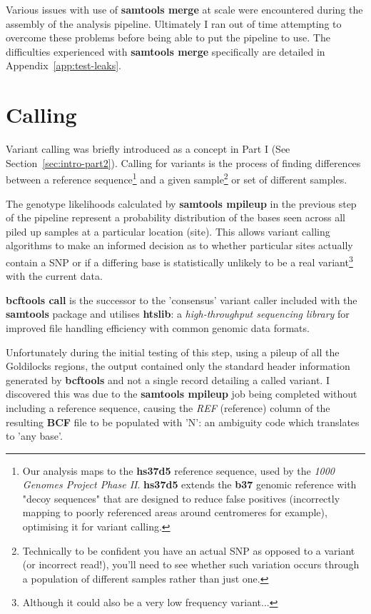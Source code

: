 Various issues with use of \textbf{samtools merge} at scale were encountered
during the assembly of the analysis pipeline. Ultimately I ran out of time
attempting to overcome these problems before being able to put the pipeline to
use. The difficulties experienced with \textbf{samtools merge} specifically are
detailed in Appendix~\ref{app:test-leaks}.



\section{Calling}

Variant calling was briefly introduced as a concept in Part I
(See Section~\ref{sec:intro-part2}). Calling for variants is the process
of finding differences between a reference sequence\footnote{Our analysis maps
    to the \textbf{hs37d5} reference sequence, used by the \textit{1000 Genomes
    Project Phase II}\citep{1k-refs}. \textbf{hs37d5} extends the \textbf{b37} genomic
    reference with "decoy sequences" that are designed to reduce false
    positives (incorrectly mapping to poorly referenced areas around centromeres for
    example\citep{biostar:decoy}), optimising it for variant
calling\citep{1k-slides}.} and a given sample\footnote{Technically to be confident
    you have an actual SNP as opposed to a variant (or incorrect read!), you'll
    need to see whether such variation occurs through a population of different
samples rather than just one.} or set of different samples.

The genotype likelihoods calculated by \textbf{samtools mpileup} in the previous
step of the pipeline represent a probability distribution of the bases seen
across all piled up samples at a particular location (site). This allows variant
calling algorithms to make an informed decision as to whether particular sites
actually contain a SNP or if a differing base is statistically unlikely to be a real
variant\footnote{Although it could also be a very low frequency variant...} with
the current data.

\textbf{bcftools call}\citep{man:bcftools-call}\citep{man:bcftools-call2} is the
successor to the 'consensus' variant caller included with the \textbf{samtools}
package and utilises \textbf{htslib}: a \textit{high-throughput sequencing
library} for improved file handling efficiency with common genomic data formats.


Unfortunately during the initial testing of this step, using a pileup of all the
Goldilocks regions, the output contained only the standard header information
generated by \textbf{bcftools} and not a single record detailing a called
variant.  I discovered this was due to the \textbf{samtools mpileup} job being
completed without including a reference sequence, causing the \textit{REF}
(reference) column of the resulting \textbf{BCF} file to be populated with 'N':
an ambiguity code which translates to 'any
base'\citep{cornish1985nomenclature}\citep{liebecq1992biochemical}.


